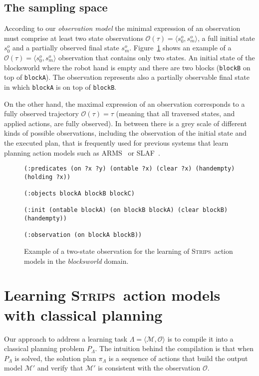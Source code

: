 \documentclass[runningheads]{llncs}
\newcommand{\tup}[1]{{\langle #1 \rangle}}
\newcommand{\strips}{\textsc{Strips}}     %
\begin{document}
\subsection{The sampling space}
According to our {\em observation model} the minimal expression of an observation must comprise at least two state observations $\mathcal{O}(\tau)=\tup{s_0^o,s_m^o}$, a full initial state $s_0^o$ and a partially observed final state $s_m^o$. Figure~\ref{fig:observation} shows an example of a $\mathcal{O}(\tau)=\tup{s_0^o,s_m^o}$ observation that contains only two states. An initial state of the blocksworld where the robot hand is empty and there are two blocks ({\tt\small{blockB}} on top of  {\tt\small{blockA}}). The observation represents also a partially observable final state in which {\tt\small{blockA}} is on top of {\tt\small{blockB}}.

On the other hand, the maximal expression of an observation corresponds to a fully observed trajectory $\mathcal{O}(\tau)=\tau$ (meaning that all traversed states, and applied actions, are fully observed). In between there is a grey scale of different kinds of possible observations, including the observation of the initial state and the executed plan, that is frequently used for previous systems that learn planning action models such as {\sc ARMS}~\cite{yang2007learning} or {\sc SLAF}~\cite{amir:alearning:JAIR08}.



\begin{figure}[hbt!]
  \begin{small}
  \begin{verbatim}
(:predicates (on ?x ?y) (ontable ?x) (clear ?x) (handempty) (holding ?x))

(:objects blockA blockB blockC)

(:init (ontable blockA) (on blockB blockA) (clear blockB) (handempty))

(:observation (on blockA blockB))
  \end{verbatim}
  \end{small}
	\caption{\small Example of a two-state observation for the learning of \strips\ action models in the {\em blocksworld} domain.}
	\label{fig:observation}
\end{figure}



\section{Learning \strips\ action models with classical planning}
Our approach to address a learning task $\Lambda=\tup{\mathcal{M},{\mathcal O}}$ is to compile it into a classical planning problem $P_{\Lambda}$. The intuition behind the compilation is that when $P_{\Lambda}$ is solved, the solution plan $\pi_\Lambda$ is a sequence of actions that build the output model $\mathcal{M'}$ and verify that $\mathcal{M'}$ is consistent with the observation ${\mathcal O}$.
\end{document}

